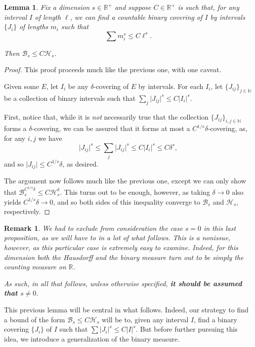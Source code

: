 \documentclass[11pt, reqno]{amsart}
\newcommand{\R}{\mathbb{R}}
\newcommand{\N}{\mathbb{N}}
\newcommand{\HH}{\mathcal{H}}
\newcommand{\BB}{\mathcal{B}}
\newtheorem{lemma}{Lemma}
\newtheorem{remark}{Remark}
\begin{document}
\begin{lemma}
Fix a dimension $s \in \R^+$ and suppose $C \in \R^+$ is such that, for any interval $I$ of length $\ell$, we can find a countable binary covering of $I$ by intervals $\{J_i\}$ of lengths $m_i$ such that
\[\sum m_i^s \leq C \ell^s.\]

Then $\BB_s \leq C \HH_s$.
\end{lemma}

\begin{proof}
This proof proceeds much like the previous one, with one caveat.

Given some $E$, let $I_i$ be any $\delta$-covering of $E$ by intervals. For each $I_i$, let $\{J_{ij}\}_{j \in \N}$ be a collection of binary intervals such that  $\sum_j \lvert J_{ij} \rvert^s \leq C \lvert I_i \rvert^s$.

First, notice that, while it is \emph{not} necessarily true that the collection $\{J_{ij}\}_{i,j \in \N}$ forms a $\delta$-covering, we can be assured that it forms at most a $C^{1/s}\delta$-covering, as, for any $i, j$ we have
\[ \lvert J_{ij} \rvert^s \leq \sum_j \lvert J_{ij} \rvert^s \leq C \lvert I_i \rvert^s \leq C \delta^s,\]
and so $\lvert J_{ij} \rvert \leq C^{1/s} \delta$, as desired.

The argument now follows much like the previous one, except we can only show that $\BB_s^{C^{1/s} \delta} \leq C \HH_s^\delta$. This turns out to be enough, however, as taking $\delta \to 0$ also yields $C^{1/s} \delta \to 0$, and so both sides of this inequality converge to $\BB_s$ and $\HH_s$, respectively.
\end{proof}

\begin{remark} \label{dimnotzero}
We had to exclude from consideration the case $s = 0$ in this last proposition, as we will have to in a lot of what follows. This is a nonissue, however, as this particular case is extremely easy to examine. Indeed, for this dimension both the Hausdorff and the binary measure turn out to be simply the counting measure on $\R$.

As such, in all that follows, unless otherwise specified, \textbf{it should be assumed that $s \neq 0$}.
\end{remark}

This previous lemma will be central in what follows. Indeed, our strategy to find a bound of the form $\BB_s \leq C \HH_s$ will be to, given any interval $I$, find a binary covering $\{J_i\}$ of $I$ such that $\sum \lvert J_i \rvert^s \leq C \lvert I \rvert^s$. But before further pursuing this idea, we introduce a generalization of the binary measure.
\end{document}
